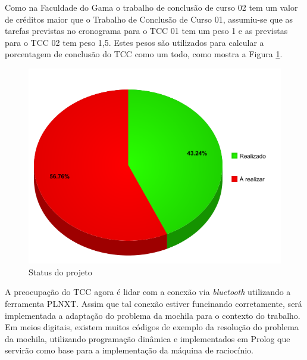 Como na Faculdade do Gama o trabalho de conclusão de curso 02 tem um valor de créditos maior que o Trabalho de Conclusão de Curso 01, assumiu-se que as tarefas previstas no cronograma para o TCC 01 tem um peso 1 e as previstas para o TCC 02 tem peso 1,5. Estes pesos são utilizados para calcular a porcentagem de conclusão do TCC como um todo, como mostra a Figura \ref{TCC}.

\FloatBarrier
\begin{figure}[!h]
\centering
\includegraphics[keepaspectratio=true,scale=0.5]{figuras/TCC.png}
\caption{Status do projeto}
\label{TCC}
\end{figure}

A preocupação do TCC agora é lidar com a conexão via \textit{bluetooth} utilizando a ferramenta PLNXT. Assim que tal conexão estiver funcinando corretamente, será implementada a adaptação do problema da mochila para o contexto do trabalho. Em meios digitais, existem muitos códigos de exemplo da resolução do problema da mochila, utilizando programação dinâmica e implementados em Prolog que servirão como base para a implementação da máquina de raciocínio. 